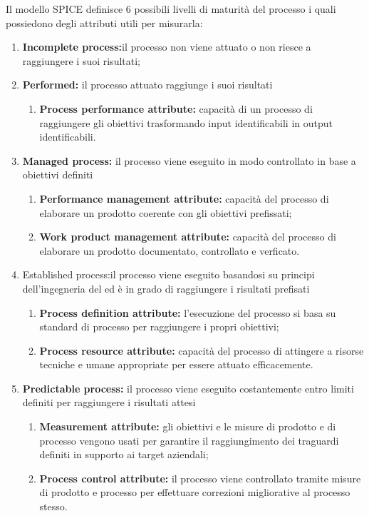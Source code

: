 \documentclass[12pt,a4paper]{article}
\begin{document}
Il modello SPICE definisce 6 possibili livelli di maturità del processo i quali possiedono
degli attributi utili per misurarla:
\begin{enumerate}
	\item\textbf{Incomplete process:}il processo non viene attuato o non riesce a raggiungere i
	suoi risultati;
	\item\textbf{Performed:} il processo attuato raggiunge i suoi risultati
	\begin{enumerate}
		\item\textbf{Process performance attribute:} capacità di un processo di raggiungere gli obiettivi trasformando input identificabili in output identificabili.
	\end{enumerate}
	
	\item\textbf{Managed process:} il processo viene eseguito in modo controllato in base a obiettivi definiti
	\begin{enumerate}
		\item\textbf{Performance management attribute:} capacità del processo di elaborare
		un prodotto coerente con gli obiettivi prefissati;
		\item\textbf{ Work product management attribute:} capacità del processo di elaborare un prodotto documentato, controllato e verficato.
	\end{enumerate}
	\item{Established process:}il processo viene eseguito basandosi su principi dell'ingegneria
	del   ed è in grado di raggiungere i risultati prefisati
	\begin{enumerate}
		\item\textbf {Process definition attribute: }l'esecuzione del processo si basa su standard
		di processo per raggiungere i propri obiettivi;
		\item\textbf{Process resource attribute: }capacità del processo di attingere a risorse
		tecniche e umane appropriate per essere attuato efficacemente.
	\end{enumerate}
	\item\textbf{Predictable process:} il processo viene eseguito costantemente entro limiti definiti
	per raggiungere i risultati attesi
	\begin{enumerate}
		\item \textbf{ Measurement attribute:} gli obiettivi e le misure di prodotto e di processo
		vengono usati per garantire il raggiungimento dei traguardi definiti in
		supporto ai target aziendali;
		\item\textbf{ Process control attribute:} il processo viene controllato tramite misure di prodotto e processo per effettuare correzioni migliorative al processo stesso.
	\end{enumerate}
	

\end{enumerate}
\end{document}
